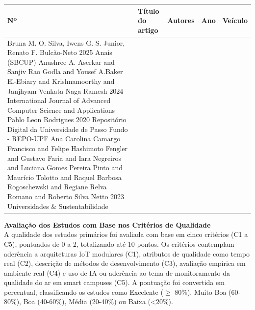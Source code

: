 \begin{table}[H]
\centering
\small
\begin{tabularx}{\textwidth}{|p{0.7cm}|Y|p{3.6cm}|p{1.6cm}|p{2.8cm}|}
\hline
\textbf{Nº} & \textbf{Título do artigo} & \textbf{Autores} & \textbf{Ano} & \textbf{Veículo} \\
\hline
\setcounter{artigoExcluido}{0}
{Bruna M. O. Silva, Iwens G. S. Junior, Renato F. Bulcão-Neto}
{2025}
{Anais (SBCUP)}
{Anushree A. Aserkar and Sanjiv Rao Godla and Yousef A.Baker El-Ebiary and Krishnamoorthy and Janjhyam Venkata Naga Ramesh}
{2024}
{International Journal of Advanced Computer Science and Applications}
{Pablo Leon Rodrigues}
{2020}
{Repositório Digital da Universidade de Passo Fundo - REPO-UPF}
{Ana Carolina Camargo Francisco and Felipe Hashimoto
  Fengler and Gustavo Faria and Iara Negreiros and Luciana Gomes
  Pereira Pinto and Maurício Tolotto and Raquel Barbosa Rogoschewski
  and Regiane Relva Romano and Roberto Silva Netto}
{2023}
{Universidades \& Sustentabilidade}
\end{tabularx}
\end{table}
\textbf{Avaliação dos Estudos com Base nos Critérios de Qualidade}\\
\newline
A qualidade dos estudos primários foi avaliada com base em cinco critérios (C1 a C5),
pontuados de 0 a 2, totalizando até 10 pontos. Os critérios contemplam aderência
a arquiteturas IoT modulares (C1), atributos de qualidade como tempo real (C2),
descrição de métodos de desenvolvimento (C3), avaliação empírica em ambiente real
(C4) e uso de IA ou aderência ao tema de monitoramento da qualidade do ar em smart campuses (C5).
A pontuação foi convertida em percentual, classificando os estudos como Excelente
($\geq$ 80\%), Muito Boa (60-80\%), Boa (40-60\%), Média (20-40\%) ou Baixa (<20\%).

\vspace{0.4cm}


